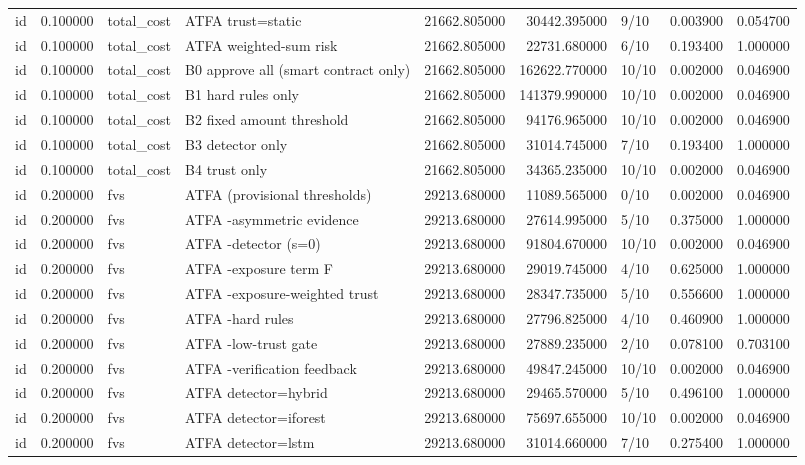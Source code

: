\begin{tabular}{lrllrrlrr}
id & 0.100000 & total\_cost & ATFA trust=static & 21662.805000 & 30442.395000 & 9/10 & 0.003900 & 0.054700 \\
id & 0.100000 & total\_cost & ATFA weighted-sum risk & 21662.805000 & 22731.680000 & 6/10 & 0.193400 & 1.000000 \\
id & 0.100000 & total\_cost & B0 approve all (smart contract only) & 21662.805000 & 162622.770000 & 10/10 & 0.002000 & 0.046900 \\
id & 0.100000 & total\_cost & B1 hard rules only & 21662.805000 & 141379.990000 & 10/10 & 0.002000 & 0.046900 \\
id & 0.100000 & total\_cost & B2 fixed amount threshold & 21662.805000 & 94176.965000 & 10/10 & 0.002000 & 0.046900 \\
id & 0.100000 & total\_cost & B3 detector only & 21662.805000 & 31014.745000 & 7/10 & 0.193400 & 1.000000 \\
id & 0.100000 & total\_cost & B4 trust only & 21662.805000 & 34365.235000 & 10/10 & 0.002000 & 0.046900 \\
id & 0.200000 & fvs & ATFA (provisional thresholds) & 29213.680000 & 11089.565000 & 0/10 & 0.002000 & 0.046900 \\
id & 0.200000 & fvs & ATFA -asymmetric evidence & 29213.680000 & 27614.995000 & 5/10 & 0.375000 & 1.000000 \\
id & 0.200000 & fvs & ATFA -detector (s=0) & 29213.680000 & 91804.670000 & 10/10 & 0.002000 & 0.046900 \\
id & 0.200000 & fvs & ATFA -exposure term F & 29213.680000 & 29019.745000 & 4/10 & 0.625000 & 1.000000 \\
id & 0.200000 & fvs & ATFA -exposure-weighted trust & 29213.680000 & 28347.735000 & 5/10 & 0.556600 & 1.000000 \\
id & 0.200000 & fvs & ATFA -hard rules & 29213.680000 & 27796.825000 & 4/10 & 0.460900 & 1.000000 \\
id & 0.200000 & fvs & ATFA -low-trust gate & 29213.680000 & 27889.235000 & 2/10 & 0.078100 & 0.703100 \\
id & 0.200000 & fvs & ATFA -verification feedback & 29213.680000 & 49847.245000 & 10/10 & 0.002000 & 0.046900 \\
id & 0.200000 & fvs & ATFA detector=hybrid & 29213.680000 & 29465.570000 & 5/10 & 0.496100 & 1.000000 \\
id & 0.200000 & fvs & ATFA detector=iforest & 29213.680000 & 75697.655000 & 10/10 & 0.002000 & 0.046900 \\
id & 0.200000 & fvs & ATFA detector=lstm & 29213.680000 & 31014.660000 & 7/10 & 0.275400 & 1.000000 \\

\end{tabular}
